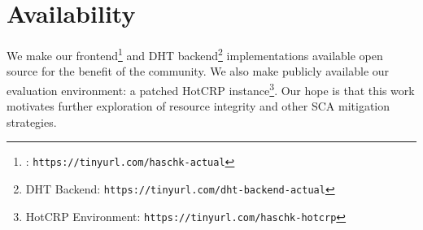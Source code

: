 \section{Availability} \label{sec:availability}

We make our \SYSTEM{} frontend\footnote{\SYSTEM{}:
\texttt{https://tinyurl.com/haschk-actual}} and DHT backend\footnote{DHT
Backend: \texttt{https://tinyurl.com/dht-backend-actual}} implementations
available open source for the benefit of the community.  We also make publicly
available our evaluation environment: a patched HotCRP instance\footnote{HotCRP
Environment: \texttt{https://tinyurl.com/haschk-hotcrp}}. Our hope is that this
work motivates further exploration of resource integrity and other SCA
mitigation strategies.
